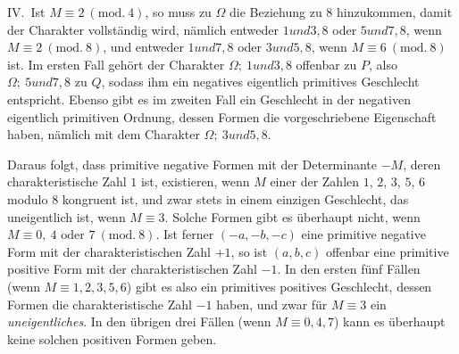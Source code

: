 IV.\ Ist $M\equiv2\ (\mathrm{mod.}\ 4)$, so muss zu $\Omega$ die Beziehung zu $8$
hinzukommen, damit der Charakter vollständig wird, nämlich entweder
$1\mathbin{\textit{und}}3,8$ oder $5\mathbin{\textit{und}}7,8$, wenn $M\equiv2\ (\mathrm{mod.}\ 8)$, und entweder $1\mathbin{\textit{und}}7,8$ oder
$3\mathbin{\textit{und}}5,8$, wenn $M\equiv6\ (\mathrm{mod.}\ 8)$ ist. Im ersten Fall gehört der Charakter
$\Omega;\ 1\mathbin{\textit{und}}3,\allowbreak 8$ offenbar zu $P$, also $\Omega;\ 5\mathbin{\textit{und}}7,\allowbreak 8$ zu $Q$, sodass ihm
ein negatives eigentlich primitives Geschlecht entspricht. Ebenso
gibt es im zweiten Fall ein Geschlecht in der negativen eigentlich
primitiven Ordnung, dessen Formen die vorgeschriebene Eigenschaft
haben, nämlich mit dem Charakter $\Omega;\ 3\mathbin{\textit{und}}5,\allowbreak 8$.

Daraus folgt, dass primitive negative Formen mit der Determinante
$-M$, deren charakteristische Zahl $1$ ist, existieren,
wenn $M$ einer der Zahlen $1$, $2$, $3$, $5$,
$6$ modulo $8$ kongruent ist, und zwar stets in einem einzigen
Geschlecht, das uneigentlich ist, wenn $M\equiv3$. Solche Formen gibt
es überhaupt nicht, wenn $M\equiv0,\allowbreak \ 4\text{ oder }7\ (\mathrm{mod.}\ 8)$. Ist ferner $(-a,-b,-c)$ eine primitive
negative Form mit der charakteristischen Zahl $+1$, so ist
$(a,b,c)$ offenbar eine primitive positive Form mit der charakteristischen
Zahl $-1$. In den ersten fünf Fällen (wenn $M\equiv1,2,3,5,6$) gibt es also
ein primitives positives Geschlecht, dessen Formen die charakteristische
Zahl $-1$ haben, und zwar für $M\equiv3$ ein \textit{uneigentliches}.
In den übrigen drei Fällen (wenn $M\equiv0,4,7$) kann es überhaupt keine
solchen positiven Formen geben.

